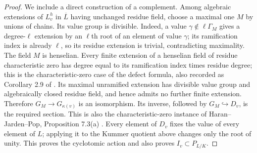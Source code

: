 \begin{proof}
We include a direct construction of a complement. Among algebraic extensions of $L_v^h$ in $\overline L$ having unchanged residue field, choose a maximal one $M$ by unions of chains. Its value group is divisible. Indeed, a value $\gamma\notin\ell\Gamma_M$ gives a degree-$\ell$ extension by an $\ell$th root of an element of value $\gamma$; its ramification index is already $\ell$, so its residue extension is trivial, contradicting maximality. The field $M$ is henselian. Every finite extension of a henselian field of residue characteristic zero has degree equal to its ramification index times residue degree; this is the characteristic-zero case of the defect formula, also recorded as Corollary 2.9 of \cite{DE_KuhlmannTame}. Its maximal unramified extension has divisible value group and algebraically closed residue field, and hence admits no further finite extension. Therefore $G_M\to G_{\kappa(v)}$ is an isomorphism. Its inverse, followed by $G_M\hookrightarrow D_v$, is the required section. This is also the characteristic-zero instance of Haran--Jarden--Pop, Proposition 7.3(a) \cite{DE_HJP}.
Every element of $D_v$ fixes the value of every element of $L$; applying it to the Kummer quotient above changes only the root of unity. This proves the cyclotomic action and also proves $I_v\subset P_{L/K}$.
\end{proof}

